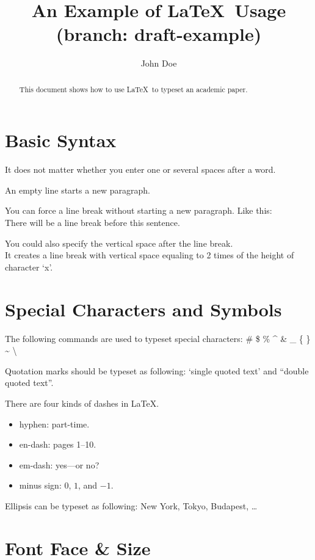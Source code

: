 \documentclass[conference]{IEEEtran}
\title{An Example of \LaTeX~Usage (branch: draft-example)}
\author{John Doe}
\begin{document}
\maketitle

\begin{abstract}
  This document shows how to use \LaTeX~to typeset an academic paper.
\end{abstract}

\section{Basic Syntax}

It does not matter whether
you enter one or several
spaces        after a word.

An empty line starts a new
paragraph.

You can force a line break without starting a new paragraph. Like this: \\
There will be a line break before this sentence.

You could also specify the vertical space after the line break. \\ [2ex]
It creates a line break with vertical space equaling to 2 times of the height of character `x'.

\section{Special Characters and Symbols}

The following commands are used to typeset special characters:
\# \$ \% \^{} \& \_ \{ \} \~{} \textbackslash

Quotation marks should be typeset as following: `single quoted text' and ``double quoted text''.

There are four kinds of dashes in \LaTeX{}.
\begin{itemize}
  \item hyphen: part-time.
  \item en-dash: pages 1--10.
  \item em-dash: yes---or no?
  \item minus sign: $0$, $1$, and $-1$.
\end{itemize}

Ellipsis can be typeset as following: New York, Tokyo, Budapest, \ldots

\section{Font Face \& Size}
\end{document}
